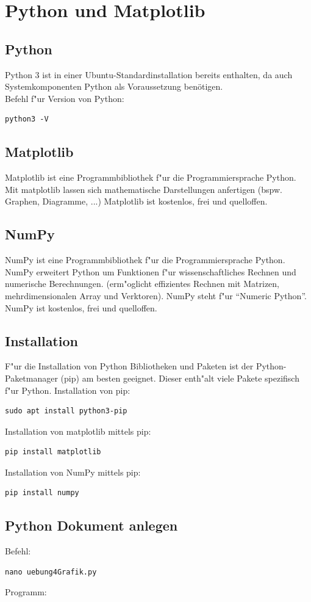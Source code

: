 \documentclass[a4paper,11pt,titlepage]{article}
\begin{document}
\section{Python und Matplotlib}
\subsection{Python}
Python 3 ist in einer Ubuntu-Standardinstallation bereits enthalten, da auch Systemkomponenten Python als Voraussetzung benötigen.\\
Befehl f"ur Version von Python: 
\begin{verbatim}python3 -V\end{verbatim}
\subsection{Matplotlib}
Matplotlib ist eine Programmbibliothek f"ur die Programmiersprache Python. Mit matplotlib lassen sich mathematische Darstellungen anfertigen (bspw. Graphen, Diagramme, ...)
Matplotlib ist kostenlos, frei und quelloffen.\\
\subsection{NumPy}
NumPy ist eine Programmbibliothek f"ur die Programmiersprache Python. NumPy erweitert Python um Funktionen f"ur wissenschaftliches Rechnen und numerische Berechnungen. (erm"oglicht effizientes Rechnen mit Matrizen, mehrdimensionalen Array und Verktoren). NumPy steht f"ur "`Numeric Python"'. NumPy ist kostenlos, frei und quelloffen.\\
\subsection{Installation}
F"ur die Installation von Python Bibliotheken und Paketen ist der Python-Paketmanager (pip) am besten geeignet. Dieser enth"alt viele Pakete spezifisch f"ur Python.
Installation von pip: 
\begin{verbatim}sudo apt install python3-pip \end{verbatim}
Installation von matplotlib mittels pip: 
\begin{verbatim}pip install matplotlib \end{verbatim}
Installation von NumPy mittels pip: 
\begin{verbatim}pip install numpy\end{verbatim}
\subsection{Python Dokument anlegen}
Befehl: 
\begin{verbatim}nano uebung4Grafik.py\end{verbatim}
Programm:\\

\end{document}
